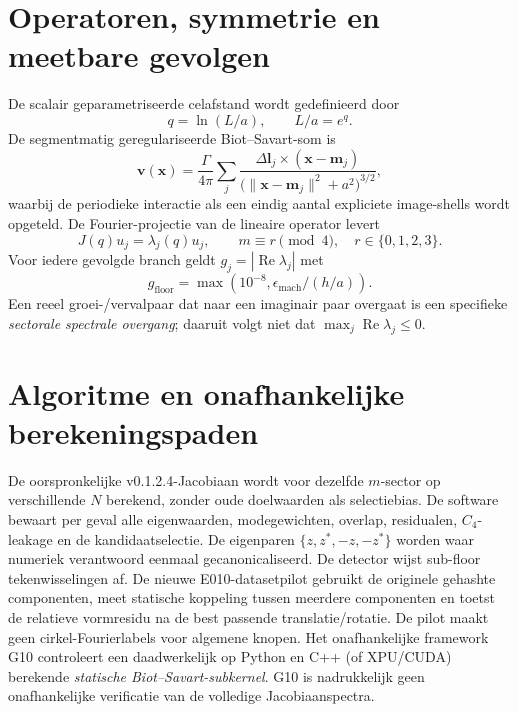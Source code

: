 \documentclass[11pt,a4paper]{article}
\begin{document}
\section{Operatoren, symmetrie en meetbare gevolgen}
De scalair geparametriseerde celafstand wordt gedefinieerd door
\begin{equation}q=\ln(L/a),\qquad L/a=e^q.\label{eq:q}\end{equation}
De segmentmatig geregulariseerde Biot--Savart-som is
\begin{equation}
\mathbf v(\mathbf x)=\frac{\Gamma}{4\pi}\sum_j\frac{\Delta\mathbf l_j\times(\mathbf x-\mathbf m_j)}{\bigl(\|\mathbf x-\mathbf m_j\|^2+a^2\bigr)^{3/2}},\label{eq:bs}
\end{equation}
waarbij de periodieke interactie als een eindig aantal expliciete image-shells wordt opgeteld. De Fourier-projectie van de lineaire operator levert
\begin{equation}
J(q)u_j=\lambda_j(q)u_j,\qquad m\equiv r\pmod{4},\quad r\in\{0,1,2,3\}.\label{eq:eig}
\end{equation}
Voor iedere gevolgde branch geldt $g_j=|\operatorname{Re}\lambda_j|$ met
\begin{equation}
g_{\mathrm{floor}}=\max(10^{-8},\epsilon_{\mathrm{mach}}/(h/a)).\label{eq:floor}
\end{equation}
Een reeel groei-/vervalpaar dat naar een imaginair paar overgaat is een specifieke \emph{sectorale spectrale overgang}; daaruit volgt niet dat $\max_j\operatorname{Re}\lambda_j\le0$.

\section{Algoritme en onafhankelijke berekeningspaden}
De oorspronkelijke v0.1.2.4-Jacobiaan wordt voor dezelfde $m$-sector op verschillende $N$ berekend, zonder oude doelwaarden als selectiebias. De software bewaart per geval alle eigenwaarden, modegewichten, overlap, residualen, $C_4$-leakage en de kandidaatselectie. De eigenparen $\{z,z^*,-z,-z^*\}$ worden waar numeriek verantwoord eenmaal gecanonicaliseerd. De detector wijst sub-floor tekenwisselingen af.
De nieuwe E010-datasetpilot gebruikt de originele gehashte componenten, meet statische koppeling tussen meerdere componenten en toetst de relatieve vormresidu na de best passende translatie/rotatie. De pilot maakt geen cirkel-Fourierlabels voor algemene knopen. Het onafhankelijke framework G10 controleert een daadwerkelijk op Python en C++ (of XPU/CUDA) berekende \emph{statische Biot--Savart-subkernel}. G10 is nadrukkelijk geen onafhankelijke verificatie van de volledige Jacobiaanspectra.
\end{document}
